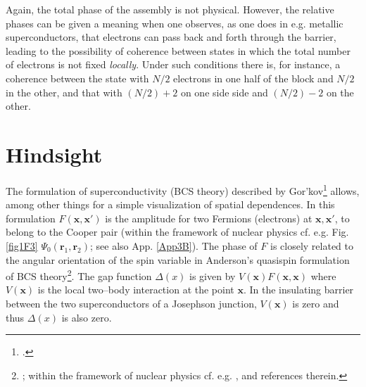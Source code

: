 Again, the total phase of the assembly is not physical. However, the relative phases can be given a meaning when one observes, as one does in e.g. metallic superconductors, that electrons can pass back and forth through the barrier, leading to the possibility of coherence between states in which the total number of electrons is not fixed \emph{locally}. Under such conditions there is, for instance, a coherence between the state with $N/2$ electrons in one half of the block and $N/2$ in the other, and that with $(N/2)+2$ on one side side and $(N/2)-2$ on the other.










\section{Hindsight}\label{C3AppE}
The formulation of superconductivity (BCS theory) described by Gor'kov\footnote{\cite{Gorkov:58,Gorkov:59}.} allows, among other things for a simple visualization of spatial dependences. In this formulation $F(\mathbf{x},\mathbf{x}')$ is the amplitude for two Fermions (electrons) at $\mathbf{x},\mathbf{x}'$, to belong to the Cooper pair (within the framework of nuclear physics cf. e.g. Fig. \ref{fig1F3} $\Psi_0(\mathbf{r}_1,\mathbf{r}_2)$; see also App. \ref{App3B}). The phase of $F$ is closely  related to the angular orientation of the spin variable  in Anderson's quasispin formulation of BCS theory\footnote{\cite{Anderson:58b}; within the framework of nuclear physics cf. e.g. \cite{Bohr:88}, \cite{Potel:13b} and references therein.}. The gap function $\Delta(x)$ is given by $V(\mathbf{x})F(\mathbf{x},\mathbf{x})$ where $V(\mathbf{x})$ is the local two--body interaction at the point $\mathbf x$. In the insulating barrier between the two superconductors of a Josephson junction, $V(\mathbf{x})$ is zero and thus $\Delta(x)$ is also zero. 



